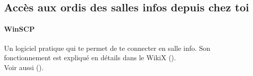 \subsection{Acc\`es aux ordis des salles infos depuis chez toi}

                 
  \paragraph{WinSCP} Un logiciel pratique qui te permet de te connecter en salle info.
                  Son fonctionnement est expliqu\'e en d\'etails dans le WikiX ().  \\
                  Voir aussi  ().
